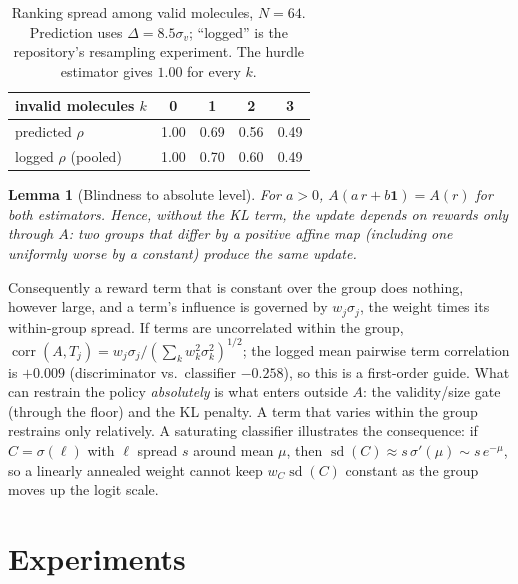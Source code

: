 \documentclass[10pt,letterpaper]{article}
\newtheorem{lemma}{Lemma}
\newcommand{\sd}{\operatorname{sd}}
\begin{document}
\begin{table}[t]
\centering
\caption{Ranking spread among valid molecules, $N=64$. Prediction uses $\Delta=8.5\sigma_v$; ``logged'' is the repository's resampling experiment. The hurdle estimator gives $1.00$ for every $k$.}
\label{tab:spread}
\begin{tabular}{@{}lcccc@{}}\toprule
invalid molecules $k$ & 0 & 1 & 2 & 3\\\midrule
predicted $\rho$ & 1.00 & 0.69 & 0.56 & 0.49\\
logged $\rho$ (pooled) & 1.00 & 0.70 & 0.60 & 0.49\\\bottomrule
\end{tabular}
\end{table}

\begin{lemma}[Blindness to absolute level]\label{lem:blind}
For $a>0$, $A(a\,r+b\mathbf 1)=A(r)$ for both estimators. Hence, without the KL term, the update depends on rewards only through $A$: two groups that differ by a positive affine map (including one uniformly worse by a constant) produce the same update.
\end{lemma}
Consequently a reward term that is constant over the group does nothing, however large, and a term's influence is governed by $w_j\sigma_j$, the weight times its within-group spread. If terms are uncorrelated within the group, $\operatorname{corr}(A,T_j)=w_j\sigma_j/(\sum_k w_k^2\sigma_k^2)^{1/2}$; the logged mean pairwise term correlation is $+0.009$ (discriminator vs.\ classifier $-0.258$), so this is a first-order guide. What can restrain the policy \emph{absolutely} is what enters outside $A$: the validity/size gate (through the floor) and the KL penalty. A term that varies within the group restrains only relatively. A saturating classifier illustrates the consequence: if $C=\sigma(\ell)$ with $\ell$ spread $s$ around mean $\mu$, then $\sd(C)\approx s\,\sigma'(\mu)\sim s\,e^{-\mu}$, so a linearly annealed weight cannot keep $w_C\sd(C)$ constant as the group moves up the logit scale.

\section{Experiments}
\end{document}
